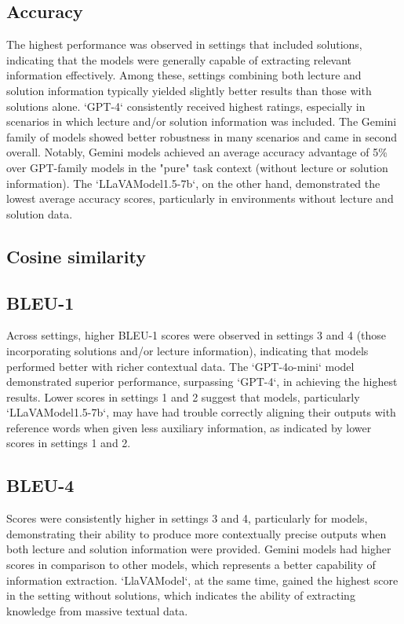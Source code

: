 \documentclass[10pt]{article}
\begin{document}
\subsection{Accuracy}
The highest performance was observed in settings that included solutions, indicating that the models were generally capable of extracting relevant information effectively. Among these, settings combining both lecture and solution information typically yielded slightly better results than those with solutions alone. `GPT-4` consistently received highest ratings, especially in scenarios in which lecture and/or solution information was included. The Gemini family of models showed better robustness in many scenarios and came in second overall. Notably, Gemini models achieved an average accuracy advantage of 5\% over GPT-family models in the "pure" task context (without lecture or solution information). The `LLaVAModel1.5-7b`, on the other hand, demonstrated the lowest average accuracy scores, particularly in environments without lecture and solution data.

\subsection{Cosine similarity}
\subsection{BLEU-1}
Across settings, higher BLEU-1 scores were observed in settings 3 and 4 (those incorporating solutions and/or lecture information), indicating that models performed better with richer contextual data. The `GPT-4o-mini` model demonstrated superior performance, surpassing `GPT-4`, in achieving the highest results. Lower scores in settings 1 and 2 suggest that models, particularly `LLaVAModel1.5-7b`, may have had trouble correctly aligning their outputs with reference words when given less auxiliary information, as indicated by lower scores in settings 1 and 2. 

\subsection{BLEU-4}
Scores were consistently higher in settings 3 and 4, particularly for  models, demonstrating their ability to produce more contextually precise outputs when both lecture and solution information were provided. Gemini models had higher scores in comparison to other models, which represents a better capability of information extraction. `LlaVAModel`, at the same time, gained the highest score in the setting without solutions, which indicates the ability of extracting knowledge from massive textual data.
\end{document}
